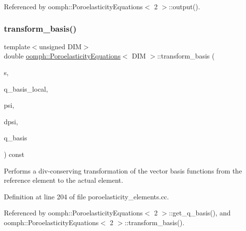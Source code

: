 Referenced by oomph\+::\+Poroelasticity\+Equations$<$ 2 $>$\+::output().

\mbox{\label{classoomph_1_1PoroelasticityEquations_a43ab3d7f2f96d78346979b5eb4b2b986}} 
\subsubsection{\texorpdfstring{transform\+\_\+basis()}{transform\_basis()}\hspace{0.1cm}{\footnotesize\ttfamily [1/2]}}
{\footnotesize\ttfamily template$<$unsigned D\+IM$>$ \\
double \hyperlink{classoomph_1_1PoroelasticityEquations}{oomph\+::\+Poroelasticity\+Equations}$<$ D\+IM $>$\+::transform\+\_\+basis (\begin{DoxyParamCaption}\item[{const \hyperlink{classoomph_1_1Vector}{Vector}$<$ double $>$ \&}]{s,  }\item[{const \hyperlink{classoomph_1_1Shape}{Shape} \&}]{q\+\_\+basis\+\_\+local,  }\item[{\hyperlink{classoomph_1_1Shape}{Shape} \&}]{psi,  }\item[{\hyperlink{classoomph_1_1DShape}{D\+Shape} \&}]{dpsi,  }\item[{\hyperlink{classoomph_1_1Shape}{Shape} \&}]{q\+\_\+basis }\end{DoxyParamCaption}) const}



Performs a div-\/conserving transformation of the vector basis functions from the reference element to the actual element. 



Definition at line 204 of file poroelasticity\+\_\+elements.\+cc.



Referenced by oomph\+::\+Poroelasticity\+Equations$<$ 2 $>$\+::get\+\_\+q\+\_\+basis(), and oomph\+::\+Poroelasticity\+Equations$<$ 2 $>$\+::transform\+\_\+basis().

\mbox{\label{classoomph_1_1PoroelasticityEquations_aef2c46b6662e90e0c09c8825281e4b9c}} 
